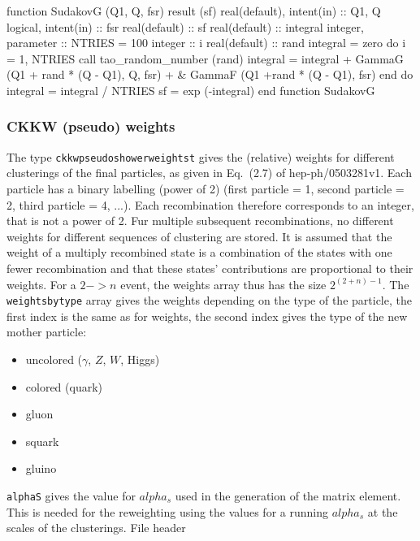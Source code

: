 \eatline
\nwendcode{}\nwdocspar
\nwenddocs{}\plusendmoddef
  function SudakovG (Q1, Q, fsr) result (sf)
    real(default), intent(in) :: Q1, Q
    logical, intent(in) :: fsr
    real(default) :: sf
    real(default) :: integral
    integer, parameter :: NTRIES = 100
    integer :: i
    real(default) :: rand
    integral = zero
    do i = 1, NTRIES
       call tao_random_number (rand)
       integral = integral + GammaG (Q1 + rand * (Q - Q1), Q, fsr) + &
            GammaF (Q1 +rand * (Q - Q1), fsr)
    end do
    integral = integral / NTRIES
    sf = exp (-integral)
  end function SudakovG

\eatline
\nwendcode{}\nwdocspar
\subsubsection{CKKW (pseudo) weights}

The type {\tt{}ckkw{}pseudo{}shower{}weights{}t} gives the (relative) weights
for different clusterings of the final particles, as given in Eq.~(2.7) of
hep-ph/0503281v1. Each particle has a binary labelling (power of 2)
(first particle = 1, second particle = 2, third particle = 4,
...). Each recombination therefore corresponds to an integer, that is
not a power of 2. Fur multiple subsequent recombinations, no different
weights for different sequences of clustering are stored. It is
assumed that the weight of a multiply recombined state is a
combination of the states with one fewer recombination and that these
states' contributions are proportional to their weights. For a $2->n$
event, the weights array thus has the size $2^{(2 + n) - 1}$. The
{\tt{}weights{}by{}type} array gives the weights depending on the type of
the particle, the first index is the same as for weights, the second
index gives the type of the new mother particle:
\begin{itemize}
  \item[0:] uncolored ($\gamma$, $Z$, $W$, Higgs)
  \item[1:] colored (quark)
  \item[2:] gluon
  \item[3:] squark
  \item[4:] gluino
\end{itemize}
{\tt{}alphaS} gives the value for $alpha_s$ used in the generation of the
matrix element. This is needed for the reweighting using the values
for a running $alpha_s$ at the scales of the clusterings.
\nwenddocs{}\endmoddef
\LA{}File header\RA{}

